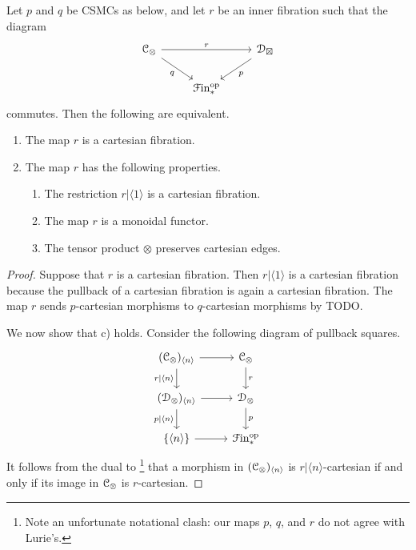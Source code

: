 \documentclass[main.tex]{subfiles}
\begin{document}
\begin{lemma}
  Let $p$ and $q$ be CSMCs as below, and let $r$ be an inner fibration such that the diagram
  \begin{equation*}
    \begin{tikzcd}
      \category{C}_{\otimes}
      \arrow[rr, "r"]
      \arrow[dr, swap, "q"]
      && \category{D}_{\boxtimes}
      \arrow[dl, "p"]
      \\
      & \Finp\op
    \end{tikzcd}
  \end{equation*}
  commutes. Then the following are equivalent.
  \begin{enumerate}
    \item The map $r$ is a cartesian fibration.

    \item The map $r$ has the following properties.
      \begin{enumerate}
        \item The restriction $r|\langle 1 \rangle$ is a cartesian fibration.

        \item The map $r$ is a monoidal functor.

        \item The tensor product $\otimes$ preserves cartesian edges.
      \end{enumerate}
  \end{enumerate}
\end{lemma}
\begin{proof}
  Suppose that $r$ is a cartesian fibration. Then $r|\langle 1 \rangle$ is a cartesian fibration because the pullback of a cartesian fibration is again a cartesian fibration. The map $r$ sends $p$-cartesian morphisms to $q$-cartesian morphisms by TODO.

  We now show that c) holds. Consider the following diagram of pullback squares.
  \begin{equation*}
    \begin{tikzcd}
    (\category{C}_{\otimes})_{\langle n \rangle}
    \arrow[r]
    \arrow[d, swap, "r|\langle n \rangle"]
    & \category{C}_{\otimes}
    \arrow[d, "r"]
    \\
    (\category{D}_{\otimes})_{\langle n \rangle}
    \arrow[r]
    \arrow[d, swap, "p|\langle n \rangle"]
    & \category{D}_{\otimes}
    \arrow[d, "p"]
    \\
    \{\langle n \rangle\}
    \arrow[r]
    & \Finp\op
    \end{tikzcd}
  \end{equation*}
  It follows from the dual to \cite[Cor.~4.3.1.15]{highertopostheory}\footnote{Note an unfortunate notational clash: our maps $p$, $q$, and $r$ do not agree with Lurie's.} that a morphism in $(\mathcal{C}_{\otimes})_{\langle n \rangle}$ is $r|\langle n \rangle$-cartesian if and only if its image in $\mathcal{C}_{\otimes}$ is $r$-cartesian.

\end{proof}
\end{document}
